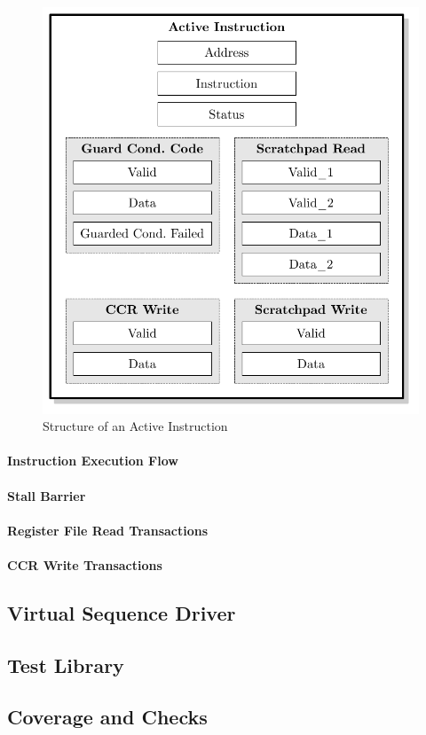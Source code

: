 \begin{figure}[htb]
 \centering
 \includegraphics[scale=1.0]{images/active_inst}
 \caption{Structure of an Active Instruction}
\label{fig:active_inst}
\end{figure}

\paragraph{Instruction Execution Flow}

\paragraph{Stall Barrier}

\paragraph{Register File Read Transactions}

\paragraph{CCR Write Transactions}

\subsection{Virtual Sequence Driver}

\subsection{Test Library}

\subsection{Coverage and Checks}